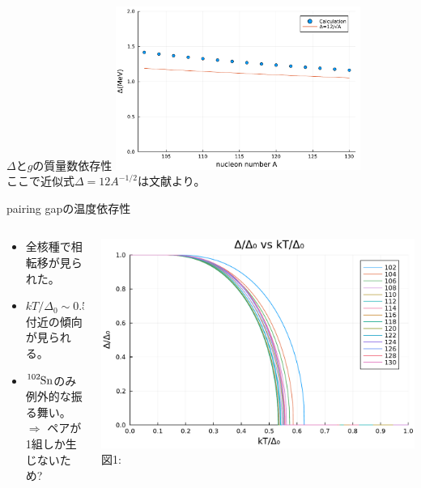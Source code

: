 \documentclass[aspectratio=169, 12pt, dvipdfmx]{beamer}
\begin{document}
\begin{frame}{$\Delta$と$g$の質量数依存性}
  \centering
  \includegraphics[width=0.6\textwidth]{Delta_vs_A.pdf}\\
  ここで近似式$\Delta=12A^{-1/2}$は文献\cite{nucleus_structure}より。
\end{frame}

\begin{frame}{pairing gapの温度依存性}
  \begin{columns}[totalwidth=1.0\linewidth]
    \begin{column}[t]{0.4\linewidth}
      \begin{itemize}
        \item 全核種で相転移が見られた。
        \item $kT/\Delta_0\sim0.55$付近の傾向が見られる。
        \item $\ce{{}^{102}Sn}$のみ例外的な振る舞い。\\$\Rightarrow$ ペアが1組しか生じないため?
      \end{itemize}
    \end{column}

    \begin{column}[T]{0.6\linewidth}
      \centering
      \includegraphics[width=\textwidth]{Comp_FT_dT.pdf}
      \vspace{5pt} %
      \scriptsize 図1:
  \end{column}
  \end{columns}
\end{frame}
\end{document}
